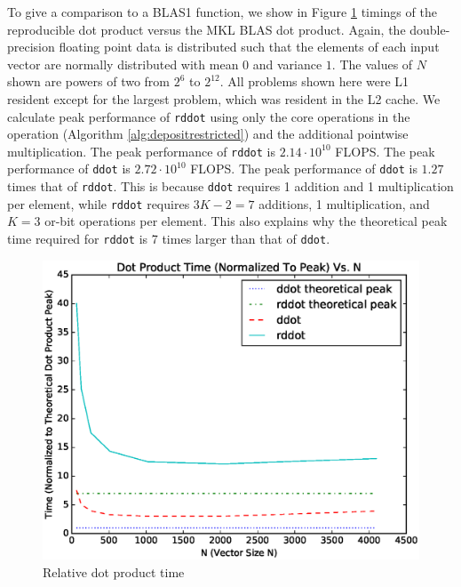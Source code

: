     To give a comparison to a BLAS1 function, we show in Figure \ref{fig:dot_timings} timings of the reproducible dot product versus the MKL BLAS dot product. Again, the double-precision floating point data is distributed such that the elements of each input vector are normally distributed with mean $0$ and variance $1$. The values of $N$ shown are powers of two from $2^6$ to $2^{12}$. All problems shown here were L1 resident except for the largest problem, which was resident in the L2 cache. We calculate peak performance of \texttt{rddot} using only the core operations in the  operation (Algorithm \ref{alg:depositrestricted}) and the additional pointwise multiplication. The peak performance of \texttt{rddot} is $2.14\cdot 10^{10}$ FLOPS. The peak performance of \texttt{ddot} is $2.72\cdot 10^{10}$ FLOPS. The peak performance of \texttt{ddot} is $1.27$ times that of \texttt{rddot}. This is because \texttt{ddot} requires 1 addition and 1 multiplication per element, while \texttt{rddot} requires $3K - 2 = 7$ additions, 1 multiplication, and $K = 3$ or-bit operations per element. This also explains why the theoretical peak time required for \texttt{rddot} is 7 times larger than that of \texttt{ddot}.
  \begin{figure}[H]
  \begin{center}
  \includegraphics[width=\textwidth]{plots/dot_comparison}
  \caption{Relative dot product time}
  \label{fig:dot_timings}
  \end{center}
  \end{figure}
